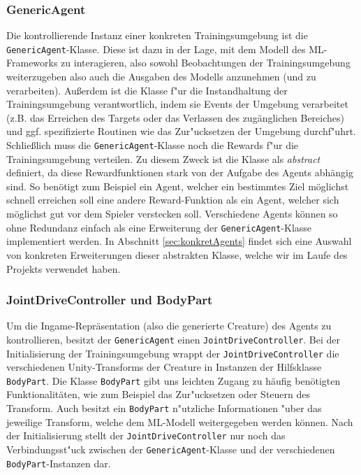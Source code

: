 \subsubsection{GenericAgent}

Die kontrollierende Instanz einer konkreten Trainingsumgebung ist die \texttt{GenericAgent}-Klasse. Diese ist dazu in der Lage, mit dem Modell des ML-Frameworks zu interagieren, also sowohl Beobachtungen der Trainingsumgebung weiterzugeben also auch die Ausgaben des Modells anzunehmen (und zu verarbeiten). Außerdem ist die Klasse f"ur die Instandhaltung der Trainingsumgebung verantwortlich, indem sie Events der Umgebung verarbeitet (z.B. das Erreichen des Targets oder das Verlassen des zugänglichen Bereiches) und ggf. spezifizierte Routinen wie das Zur"ucksetzen der Umgebung durchf"uhrt.
Schließlich muss die \texttt{GenericAgent}-Klasse noch die Rewards f"ur die Trainingsumgebung verteilen. Zu diesem Zweck ist die Klasse als \textit{abstract} definiert, da diese Rewardfunktionen stark von der Aufgabe des Agents abhängig sind. So benötigt zum Beispiel ein Agent, welcher ein bestimmtes Ziel möglichst schnell erreichen soll eine andere Reward-Funktion als ein Agent, welcher sich möglichst gut vor dem Spieler verstecken soll. Verschiedene Agents können so ohne Redundanz einfach als eine Erweiterung der \texttt{GenericAgent}-Klasse implementiert werden. In Abschnitt \ref{sec:konkretAgents} findet sich eine Auswahl von konkreten Erweiterungen dieser abstrakten Klasse, welche wir im Laufe des Projekts verwendet haben.

\subsubsection{JointDriveController und BodyPart}

Um die Ingame-Repräsentation (also die generierte Creature) des Agents zu kontrollieren, besitzt der \texttt{GenericAgent} einen \texttt{JointDriveController}. Bei der Initialisierung der Trainingsumgebung wrappt der \texttt{JointDrive\-Controller} die verschiedenen Unity-Transforms der Creature in Instanzen der Hilfsklasse \texttt{BodyPart}. Die Klasse \texttt{BodyPart} gibt uns leichten Zugang zu häufig benötigten Funktionalitäten, wie zum Beispiel das Zur"ucksetzen oder Steuern des Transform. Auch besitzt ein \texttt{BodyPart} n"utzliche Informationen "uber das jeweilige Transform, welche dem ML-Modell weitergegeben werden können. Nach der Initialisierung stellt der \texttt{JointDriveController} nur noch das Verbindungsst"uck zwischen der \texttt{GenericAgent}-Klasse und der verschiedenen \texttt{BodyPart}-Instanzen dar. 


